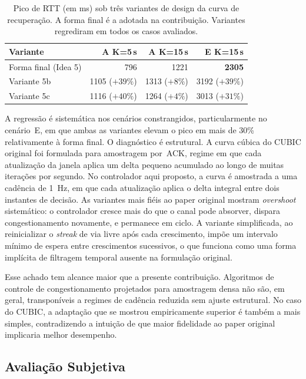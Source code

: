 \begin{table}[!t]
  \caption{Pico de RTT (em ms) sob três variantes de design da
  curva de recuperação. A forma final é a adotada na
  contribuição. Variantes regrediram em todos os casos
  avaliados.}
  \label{tab:sensitivity}
  \centering
  \begin{tabular}{lrrr}
    \toprule
    \textbf{Variante} & \textbf{A K=5\,s} & \textbf{A K=15\,s} & \textbf{E K=15\,s} \\
    \midrule
    Forma final (Idea 5)  & 796   & 1221  & \textbf{2305} \\
    Variante 5b           & 1105 \scriptsize($+39\%$) & 1313 \scriptsize($+8\%$)  & 3192 \scriptsize($+39\%$) \\
    Variante 5c           & 1116 \scriptsize($+40\%$) & 1264 \scriptsize($+4\%$)  & 3013 \scriptsize($+31\%$) \\
    \bottomrule
  \end{tabular}
\end{table}

A regressão é sistemática nos cenários constrangidos,
particularmente no cenário~E, em que ambas as variantes
elevam o pico em mais de 30\% relativamente à forma final. O
diagnóstico é estrutural. A curva cúbica do CUBIC original foi
formulada para amostragem por~ACK, regime em que cada
atualização da janela aplica um delta pequeno acumulado ao
longo de muitas iterações por segundo. No controlador aqui
proposto, a curva é amostrada a uma cadência de 1~Hz, em que
cada atualização aplica o delta integral entre dois instantes
de decisão. As variantes mais fiéis ao paper original mostram
\emph{overshoot} sistemático: o controlador cresce mais do que
o canal pode absorver, dispara congestionamento novamente, e
permanece em ciclo. A variante simplificada, ao reinicializar
o \emph{streak} de via livre após cada crescimento, impõe um
intervalo mínimo de espera entre crescimentos sucessivos, o
que funciona como uma forma implícita de filtragem temporal
ausente na formulação original.

Esse achado tem alcance maior que a presente contribuição.
Algoritmos de controle de congestionamento projetados para
amostragem densa não são, em geral, transponíveis a regimes de
cadência reduzida sem ajuste estrutural. No caso do CUBIC, a
adaptação que se mostrou empiricamente superior é também a
mais simples, contradizendo a intuição de que maior fidelidade
ao paper original implicaria melhor desempenho.

\subsection{Avaliação Subjetiva}

